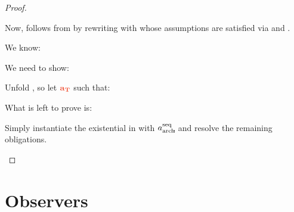 \documentclass[12pt]{article}
\begin{document}
\begin{proof}
\begin{proofcase}{\subseteq}
    Now,  follows from  by rewriting with  whose assumptions are satisfied via  and .
  \end{proofcase}
  \begin{proofcase}{\supseteq}
    We know: 
    \begin{passumptions}
    \end{passumptions}
    We need to show:
    \begin{goals}
    \end{goals}
    Unfold , so let $\trg{\varEvent[T]}$ such that:
    \begin{passumptions}
    \end{passumptions}
    What is left to prove is:
    \begin{goals}
    \end{goals}
    Simply instantiate the existential in  with $a^{\text{seq}}_{\text{arch}}\kern-3pt{}$,  and  resolve the remaining obligations.
  \end{proofcase}
\end{proof}

\section{Observers}
\end{document}
